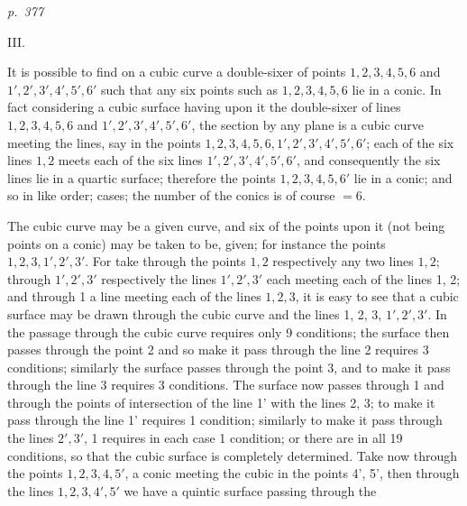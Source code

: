 \documentclass[11pt,a4paper]{article}
\theoremstyle{plain}
\theoremstyle{definition}
\begin{document}
\clearpage


\bigskip
\textit{p.~377}
\smallskip

\noindent
\textsc{III.}

It is possible to find on a cubic curve a double-sixer of points $1, 2, 3, 4, 5, 6$
and $1', 2', 3', 4', 5', 6'$ such that any six points such as $1, 2, 3, 4, 5, 6$ lie in a
conic.  In fact considering a cubic surface having upon it the double-sixer of lines
$1, 2, 3, 4, 5, 6$ and $1', 2', 3', 4', 5', 6'$, the section by any plane is a cubic curve
meeting the lines, say in the points $1, 2, 3, 4, 5, 6, 1', 2', 3', 4', 5', 6'$; each of the
six lines $1, 2$ meets each of the six lines $1', 2', 3', 4', 5', 6'$, and consequently the six
lines lie in a quartic surface; therefore the points $1, 2, 3, 4, 5, 6'$ lie in a conic; and so in like
order; cases; the number of the conics is of course $= 6$.

The cubic curve may be a given curve, and six of the points upon it (not being
points on a conic) may be taken to be, given; for instance the points $1, 2, 3, 1', 2', 3'$.
For take through the points $1, 2$ respectively any two lines $1, 2$; through $1', 2', 3'$
respectively the lines $1', 2', 3'$ each meeting each of the lines 1, 2; and through 1
a line meeting each of the lines $1, 2, 3$, it is easy to see that a cubic surface may
be drawn through the cubic curve and the lines 1, 2, 3, $1', 2', 3'$.  In the passage
through the cubic curve requires only 9 conditions; the surface then passes through the point
2 and so make it pass through the line 2 requires 3 conditions; similarly the surface
passes through the point 3, and to make it pass through the line 3 requires 3 conditions.
The surface now passes through 1 and through the points of intersection of the
line 1' with the lines 2, 3; to make it pass through the line 1' requires 1 condition;
similarly to make it pass through the lines $2', 3'$, 1 requires in each case 1 condition;
or there are in all 19 conditions, so that the cubic surface is completely determined.
Take now through the points $1, 2, 3, 4, 5'$, a conic meeting the cubic in the points 4',
5', then through the lines $1, 2, 3, 4', 5'$ we have a quintic surface passing through the

\clearpage
\end{document}
